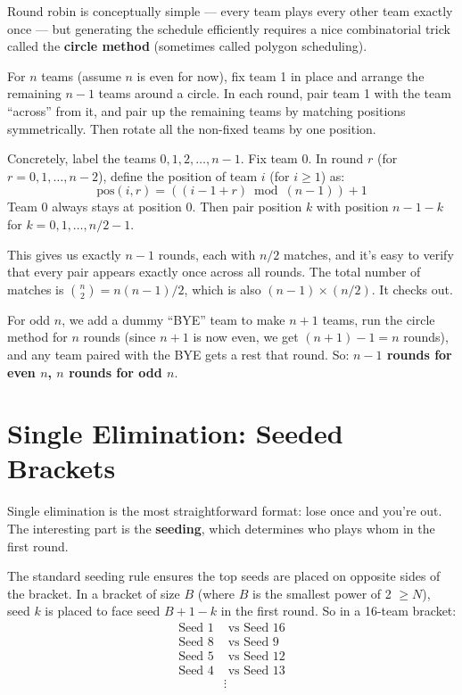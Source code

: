 \documentclass[11pt]{article}
\begin{document}
Round robin is conceptually simple --- every team plays every other team exactly once --- but generating the schedule efficiently requires a nice combinatorial trick called the \textbf{circle method} (sometimes called polygon scheduling).

For $n$ teams (assume $n$ is even for now), fix team 1 in place and arrange the remaining $n - 1$ teams around a circle. In each round, pair team 1 with the team ``across'' from it, and pair up the remaining teams by matching positions symmetrically. Then rotate all the non-fixed teams by one position.

Concretely, label the teams $0, 1, 2, \ldots, n-1$. Fix team $0$. In round $r$ (for $r = 0, 1, \ldots, n-2$), define the position of team $i$ (for $i \geq 1$) as:
\[
    \text{pos}(i, r) = ((i - 1 + r) \bmod (n - 1)) + 1
\]
Team $0$ always stays at position $0$. Then pair position $k$ with position $n - 1 - k$ for $k = 0, 1, \ldots, n/2 - 1$.

This gives us exactly $n - 1$ rounds, each with $n/2$ matches, and it's easy to verify that every pair appears exactly once across all rounds. The total number of matches is $\binom{n}{2} = n(n-1)/2$, which is also $(n-1) \times (n/2)$. It checks out.

For odd $n$, we add a dummy ``BYE'' team to make $n + 1$ teams, run the circle method for $n$ rounds (since $n + 1$ is now even, we get $(n+1) - 1 = n$ rounds), and any team paired with the BYE gets a rest that round. So: \textbf{$n - 1$ rounds for even $n$, $n$ rounds for odd $n$}.

\section{Single Elimination: Seeded Brackets}

Single elimination is the most straightforward format: lose once and you're out. The interesting part is the \textbf{seeding}, which determines who plays whom in the first round.

The standard seeding rule ensures the top seeds are placed on opposite sides of the bracket. In a bracket of size $B$ (where $B$ is the smallest power of 2 $\geq N$), seed $k$ is placed to face seed $B + 1 - k$ in the first round. So in a 16-team bracket:
\begin{align*}
    \text{Seed 1} &\text{ vs Seed 16} \\
    \text{Seed 8} &\text{ vs Seed 9} \\
    \text{Seed 5} &\text{ vs Seed 12} \\
    \text{Seed 4} &\text{ vs Seed 13} \\
    &\vdots
\end{align*}
\end{document}
